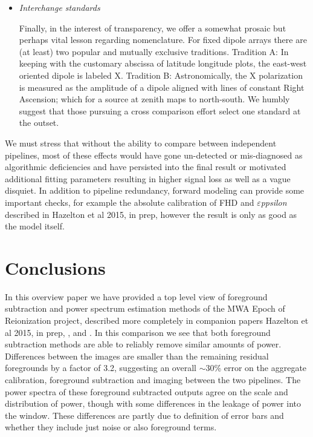 \documentclass[twolcolumn]{emulateapj}
\def\eppsilon{{\it $\varepsilon$ppsilon}}
\def\chipscite{\cite{2016arXiv160102073T}}
\def\eppsiloncite{Hazelton et al 2015, in prep}
\def\dilloncite{\cite{PhysRevD.91.123011} }
\begin{document}
\begin{itemize}
\item \emph{Interchange standards}

Finally, in the interest of transparency, we offer a somewhat prosaic but perhaps vital lesson regarding  nomenclature. For fixed dipole arrays there are (at least) two popular and mutually exclusive traditions. Tradition A: In keeping with the customary abscissa of latitude longitude plots, the east-west oriented dipole is labeled X.  Tradition B: Astronomically, the X polarization is measured as the amplitude of a dipole aligned with lines of constant Right Ascension; which for a source at zenith maps to north-south. We humbly suggest that those pursuing a cross comparison effort select one standard at the outset.  

\end{itemize}






  We must stress that without the ability to compare between independent pipelines, most of these effects would have gone un-detected or mis-diagnosed as algorithmic deficiencies and have persisted into the final result or motivated additional fitting parameters resulting in higher signal loss as well as a vague disquiet. In addition to pipeline redundancy, forward modeling can provide some important checks, for example the absolute calibration of FHD and \eppsilon{} described in \eppsiloncite{}, however the result is only as good as the model itself.
  
\section{Conclusions}
\label{sec:conclusion}
In this overview paper we have provided a top level view of foreground subtraction and power spectrum estimation methods of the MWA Epoch of Reionization project, described more completely in companion papers \eppsiloncite{}, \chipscite{}, and \dilloncite{}.  In this comparison we see that both foreground subtraction methods are able to reliably remove similar amounts of power.  Differences between the images are smaller than the remaining residual foregrounds by a factor of 3.2, suggesting an overall $\sim$30\% error on the aggregate calibration, foreground subtraction and imaging between the two pipelines.  The power spectra of these foreground subtracted outputs agree on the scale and distribution of power, though with some differences in the leakage of power into the window. These differences are partly due to definition of error bars and whether they include just noise or also foreground terms.  
\end{document}
